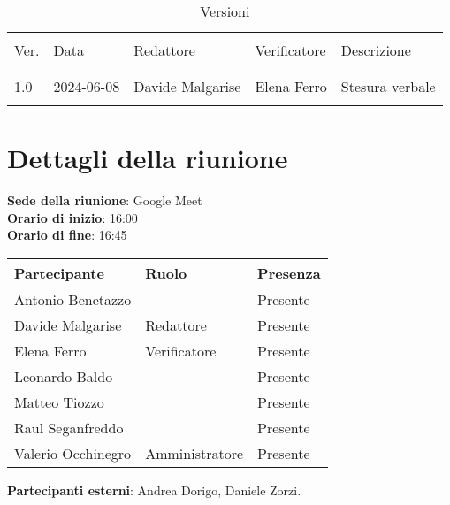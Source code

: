 \documentclass[italian,12pt]{article}
\begin{document}


\newpage



\begin{table}[!h]
	\caption{Versioni}
	\footnotesize
	\begin{center}
		\begin{tabular}{ l l l l p{6cm} }
			\hline                                                                \\[-2ex]
			Ver. & Data       & Redattore        & Verificatore & Descrizione     \\
			\\[-2ex] \hline \\[-1.5ex]
			1.0  & 2024-06-08 & Davide Malgarise & Elena Ferro  & Stesura verbale \\
			\\[-1.5ex] \hline
		\end{tabular}
	\end{center}
\end{table}

\newpage

\tableofcontents

\newpage

\section{Dettagli della riunione}


\textbf{Sede della riunione}: Google Meet\\
\textbf{Orario di inizio}: 16:00\\
\textbf{Orario di fine}: 16:45\\

\begin{flushleft}
	\begin{table}[!h]
		\begin{tabular}{ |l|l|l| }
			\hline
			\textbf{Partecipante} & \textbf{Ruolo} & \textbf{Presenza} \\
			\hline
			Antonio Benetazzo     &                & Presente          \\
			Davide Malgarise      & Redattore      & Presente          \\
			Elena Ferro           & Verificatore   & Presente          \\
			Leonardo Baldo        &                & Presente          \\
			Matteo Tiozzo         &                & Presente          \\
			Raul Seganfreddo      &                & Presente          \\
			Valerio Occhinegro    & Amministratore & Presente          \\
			\hline
		\end{tabular}
	\end{table}
	\textbf{Partecipanti esterni}: Andrea Dorigo, Daniele Zorzi.\\
\end{flushleft}
\end{document}
